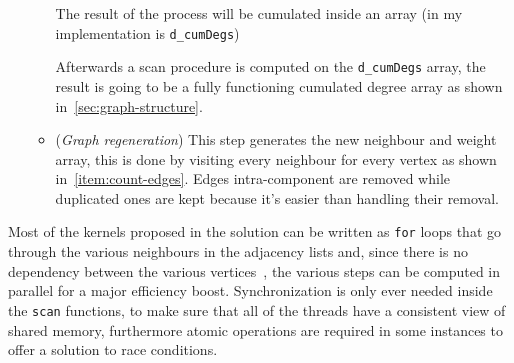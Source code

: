 \documentclass[a4paper,10pt]{article}
\begin{document}
\begin{enumerate}
\begin{itemize}
		The result of the process will be cumulated inside an array (in my
		implementation is \texttt{d\_cumDegs})

		Afterwards a scan procedure is computed on the \texttt{d\_cumDegs}
		array, the result is going to be a fully functioning cumulated
		degree array as shown in~\ref{sec:graph-structure}.
		\item\label{item:graph-regen} (\textit{Graph regeneration}) This step
		generates the new neighbour and weight array, this is done by
		visiting every neighbour for every vertex as shown in~\ref{item:count-edges}. Edges intra-component are removed while duplicated ones are kept because it's easier than handling their removal.
	\end{itemize}
\end{enumerate}
Most of the kernels proposed in the solution can be written as \texttt{for} loops that go through
the various neighbours in the adjacency lists and, since there is no dependency between the various vertices~\cite{generic-he-boruvka}, the various steps can be computed in parallel for a major efficiency boost. Synchronization is only ever needed inside the \texttt{scan} functions, to make sure that all of the threads have a consistent view of shared memory, furthermore atomic operations are required in some instances to offer a solution to race conditions.
\end{document}
